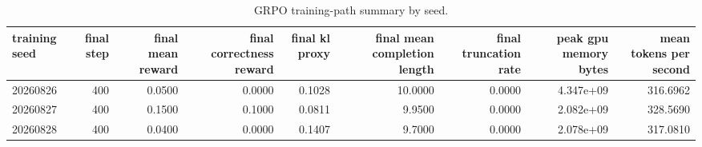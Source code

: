\begin{table}[t]
\centering
\small
\caption{GRPO training-path summary by seed.}
\label{tab:training\_summary}
\begin{tabular}{lrrrrrrrr}
\toprule
training seed & final step & final mean reward & final correctness reward & final kl proxy & final mean completion length & final truncation rate & peak gpu memory bytes & mean tokens per second \\
\midrule
20260826 & 400 & 0.0500 & 0.0000 & 0.1028 & 10.0000 & 0.0000 & 4.347e+09 & 316.6962 \\
20260827 & 400 & 0.1500 & 0.1000 & 0.0811 & 9.9500 & 0.0000 & 2.082e+09 & 328.5690 \\
20260828 & 400 & 0.0400 & 0.0000 & 0.1407 & 9.7000 & 0.0000 & 2.078e+09 & 317.0810 \\
\bottomrule
\end{tabular}
\end{table}
